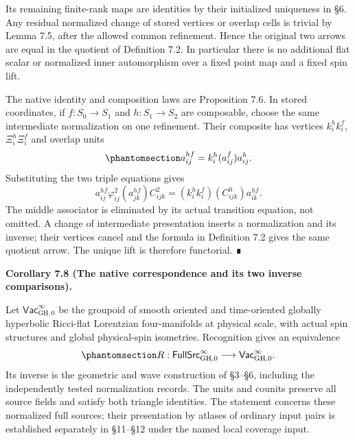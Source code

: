 \documentclass[
  english,
  11pt,
  reqno]{amsart}
\makeatletter
\newcommand{\pandocstatementheading}[1]{%
  \par\if@nobreak\else
    \addpenalty{\@beginparpenalty}%
    \addvspace{.5\baselineskip plus .2\baselineskip minus .2\baselineskip}%
  \fi
  {\normalfont\bfseries #1\par}%
  \nobreak\@afterindenttrue\@afterheading
}
\makeatother
\begin{document}
Its remaining finite-rank maps are identities by their initialized
uniqueness in §6. Any residual normalized change of stored vertices or
overlap cells is trivial by Lemma 7.5, after the allowed common
refinement. Hence the original two arrows are equal in the quotient of
Definition 7.2. In particular there is no additional flat scalar or
normalized inner automorphism over a fixed point map and a fixed spin
lift.

The native identity and composition laws are Proposition 7.6. In stored
coordinates, if \(f:S_0\to S_1\) and \(h:S_1\to S_2\) are composable,
choose the same intermediate normalization on one refinement. Their
composite has vertices \(k_i^h k_i^f\), \(\Xi_i^h\Xi_i^f\) and overlap
units
\begin{equation}\protect\phantomsection\label{eq:global-stored-arrow-composition}{
a_{ij}^{hf}=k_i^h(a_{ij}^f)a_{ij}^h.
}\end{equation} Substituting the two triple equations gives \[
a_{ij}^{hf}\varphi_{ij}^2(a_{jk}^{hf})C_{ijk}^2
 =(k_i^h k_i^f)(C_{ijk}^0)a_{ik}^{hf}.
\] The middle associator is eliminated by its actual transition
equation, not omitted. A change of intermediate presentation inserts a
normalization and its inverse; their vertices cancel and the formula in
Definition 7.2 gives the same quotient arrow. The unique lift is
therefore functorial. ∎

\pandocstatementheading{\protect{}\label{cor:global-full-source-equivalence}Corollary 7.8 (The native correspondence and its two inverse
comparisons).}

Let \(\mathsf{Vac}^{\infty}_{\mathrm{GH},0}\) be the groupoid of smooth
oriented and time-oriented globally hyperbolic Ricci-flat Lorentzian
four-manifolds at physical scale, with actual spin structures and global
physical-spin isometries. Recognition gives an equivalence
\begin{equation}\protect\phantomsection\label{eq:global-native-source-equivalence}{
R:\mathsf{FullSrc}^{\infty}_{\mathrm{GH},0}
\longrightarrow\mathsf{Vac}^{\infty}_{\mathrm{GH},0}.
}\end{equation} Its inverse is the geometric and wave construction of
§3--§6, including the independently tested normalization records. The
units and counits preserve all source fields and satisfy both triangle
identities. The statement concerns these normalized full sources; their
presentation by atlases of ordinary input pairs is established
separately in §11--§12 under the named local coverage input.
\end{document}
